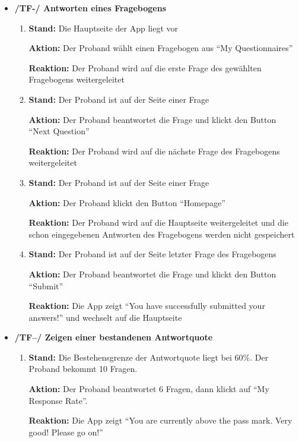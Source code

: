 \documentclass[a4paper]{scrreprt}
\begin{document}
\begin{itemize}
	        \item \textbf{/TF-/ Antworten eines Fragebogens}
	        \begin{enumerate}
	        	\item \par \textbf{Stand: }Die Hauptseite der App liegt vor
	        	\par \textbf{Aktion: }Der Proband wählt einen Fragebogen aus ``My Questionnaires''
	        	\par \textbf{Reaktion: }Der Proband wird auf die erste Frage des gewählten Fragebogens weitergeleitet
	        	\item \par \textbf{Stand: }Der Proband ist auf der Seite einer Frage
	        	\par \textbf{Aktion: }Der Proband beantwortet die Frage und klickt den Button ``Next Question''
	        	\par \textbf{Reaktion: }Der Proband wird auf die nächste Frage des Fragebogens weitergeleitet
	        	\item \par \textbf{Stand: }Der Proband ist auf der Seite einer Frage
	        	\par \textbf{Aktion: }Der Proband klickt den Button ``Homepage''
	        	\par \textbf{Reaktion: }Der Proband wird auf die Hauptseite weitergeleitet und die schon eingegebenen Antworten des Fragebogens werden nicht gespeichert
	        	\item \par \textbf{Stand: }Der Proband ist auf der Seite letzter Frage des Fragebogens
	        	\par \textbf{Aktion: }Der Proband beantwortet die Frage und klickt den Button ``Submit''
	        	\par \textbf{Reaktion: }Die App zeigt ``You have successfully submitted your answers!'' und wechselt auf die Hauptseite
	        \end{enumerate}

            \item \textbf{/TF--/ Zeigen einer bestandenen Antwortquote}
            \begin{enumerate}
                \item \par \textbf{Stand: }Die Bestehensgrenze der Antwortquote liegt bei 60\%. Der Proband bekommt 10 Fragen.
                \par \textbf{Aktion: }Der Proband beantwortet 6 Fragen, dann klickt auf “My Response Rate”.
                \par \textbf{Reaktion: }Die App zeigt “You are currently above the pass mark. Very good! Please go on!”
            \end{enumerate}


\end{itemize}
\end{document}
